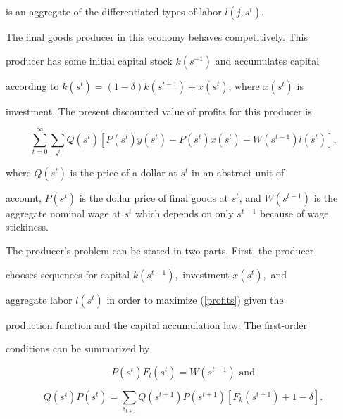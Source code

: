 \documentclass[fleqn,leqno,11pt]{article}
\begin{document}
is an aggregate of the differentiated types of labor $l(j,s^{t})$.



The final goods producer in this economy behaves competitively. This

producer has some initial capital stock $k(s^{-1})$ and accumulates capital

according to $k(s^{t})=(1-\delta )k(s^{t-1})+x(s^{t})$, where $x(s^{t})$ is

investment. The present discounted value of profits for this producer is 

\begin{equation}

\ \sum_{t=0}^{\infty }\sum_{s^{t}}Q(s^{t})\left[

P(s^{t})y(s^{t})-P(s^{t})x(s^{t})-W(s^{t-1})l(s^{t})\right] ,

\label{profits}

\end{equation}

where $Q(s^{t})$ is the price of a dollar at $s^{t}$ in an abstract unit of

account, $P(s^{t})$ is the dollar price of final goods at $s^{t}$, and $%

W(s^{t-1})$ is the aggregate nominal wage at $s^{t}$ which depends on only $%

s^{t-1}$ because of wage stickiness.



The producer's problem can be stated in two parts. First, the producer

chooses sequences for capital $k(s^{t-1}),$ investment $x(s^{t}),$ and

aggregate labor $l(s^{t})$ in order to maximize (\ref{profits}) given the

production function and the capital accumulation law. The first-order

conditions can be summarized by 

\begin{equation}

P(s^{t})F_{l}(s^{t})=W(s^{t-1})\text{ and}  \label{foc 1}

\end{equation}

\begin{equation}

Q(s^{t})P(s^{t})=\sum_{s_{t+1}}Q(s^{t+1})P(s^{t+1})[F_{k}(s^{t+1})+1-\delta

].  \label{foc 2}

\end{equation}
\end{document}
